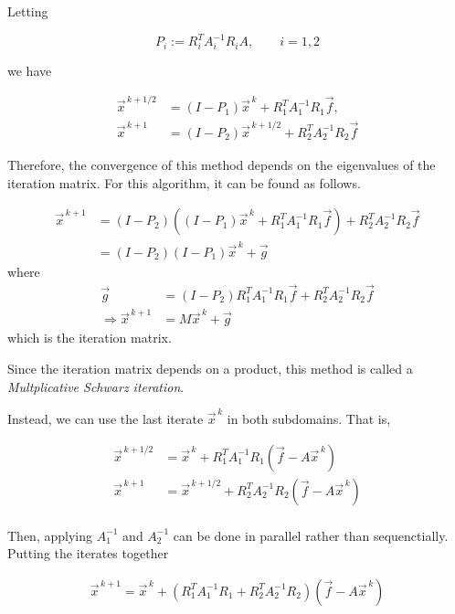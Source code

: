 Letting

\begin{equation*}
    P_i := R_i^T A_i^{-1} R_i A, \qquad i=1,2
\end{equation*}

we have

\begin{align*}
    \vec{x}^{\, k + 1/2} &= (I - P_1)\vec{x}^{\, k} +
    R_1^T A_1^{-1} R_1\vec{f},\\
    \vec{x}^{\, k + 1} &=(I - P_2) \vec{x}^{\, k + 1/2} +
    R_2^T A_2^{-1} R_2 \vec{f}
\end{align*}

Therefore, the convergence of this method depends on the eigenvalues of the iteration matrix. For this algorithm, it can be found as follows.

\begin{align*}
    \vec{x}^{\, k + 1} &= (I - P_2) \left((I - P_1)\vec{x}^{\, k} +
    R_1^T A_1^{-1} R_1\vec{f}\right) +
    R_2^T A_2^{-1} R_2 \vec{f}\\
    &= (I - P_2)(I - P_1) \vec{x}^{\, k}+ \vec{g}
\end{align*}
where
\begin{align*}
    \vec{g}&=(I - P_2)R_1^T A_1^{-1} R_1\vec{f} + R_2^T A_2^{-1} R_2 \vec{f}\\
    \Rightarrow \vec{x}^{\, k + 1} &= M\vec{x}^{\, k} + \vec{g}
\end{align*}
which is the iteration matrix.

Since the iteration matrix depends on a product, this method is called a \emph{Multplicative Schwarz iteration}.

Instead, we can use the last iterate $\vec{x}^{\, k}$ in both subdomains. That is,


\begin{align*}
    \vec{x}^{\, k + 1/2} &= \vec{x}^{\, k} +
    R_1^T A_1^{-1} R_1
    \left(\vec{f} - A\vec{x}^{\, k}\right)\\
    \vec{x}^{\, k + 1} &= \vec{x}^{\, k + 1/2} +
    R_2^T A_2^{-1} R_2
    \left(\vec{f} - A\vec{x}^{\, k}\right)\\
\end{align*}

Then, applying $A_1^{-1}$ and $A_2^{-1}$ can be done in parallel rather than sequenctially. Putting the iterates together

\begin{align*}
    \vec{x}^{\, k + 1} = \vec{x}^{\, k} +
    \left(R_1^T A_1^{-1} R_1 + R_2^T A_2^{-1} R_2\right)
    \left(\vec{f} - A\vec{x}^{\, k}\right)\\
\end{align*}

